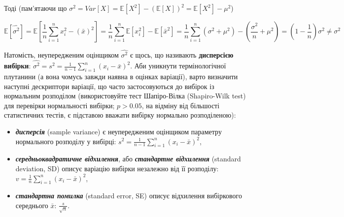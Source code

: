 \documentclass[
  11pt,
]{book}
\begin{document}
Тоді (пам'ятаючи що \(\sigma^2 = Var[X] = \mathbb{E} [X^2] - (\mathbb{E} [X])^2 = \mathbb{E} [X^2] - \mu^2\))

\[\mathbb{E} [\hat{\sigma^2}] = \mathbb{E} \left[ \frac{1}{n} \sum \limits_{i=1}^n x_i^2 - (\bar{x})^2 \right] = \frac{1}{n} \sum \limits_{i = 1}^n \mathbb{E} [x_i^2] - \mathbb{E} [\bar{x}^2] = \frac{1}{n}  \sum \limits_{i = 1}^n (\sigma^2 + \mu^2) - (\frac{\sigma^2}{n} + \mu^2) = (1 - \frac{1}{n}) \sigma^2 \neq \sigma^2\]

Натомість, неупередженим оцінщиком \(\hat{\sigma^2}\) є щось, що називають \textbf{дисперсією вибірки}: \(\hat{\sigma^2} = s^2 = \frac{1}{n-1} \sum \limits_{i=1}^n (x_i - \bar{x})^2\). Аби уникнути термінологічної плутанини (а вона чомусь завжди наявна в оцінках варіації), варто визначити наступні дескриптори варіації, що часто застосовуються до вибірок із нормальним розподілом (використовуйте тест Шапіро-Вілка (Shapiro-Wilk test) для перевірки нормальності вибірки; \(p > 0.05\), на відміну від більшості статистичних тестів, є підставою вважати вибірку нормально розподіленою):

\begin{itemize}
\item
  \textbf{\emph{дисперсія}} (sample variance) є неупередженим оцінщиком параметру нормального розподілу у вибірці: \(s^2 = \frac{1}{n-1} \sum \limits_{i=1}^n (x_i - \bar{x})^2\),
\item
  \textbf{\emph{середньоквадратичне відхилення}}, або \textbf{\emph{стандартне відхилення}} (standard deviation, SD) описує варіацію вибірки незалежно від її розподілу: \(v = \frac{1}{n} \sum \limits_{i=1}^n (x_i - \bar{x})^2\),
\item
  \textbf{\emph{стандартна помилка}} (standard error, SE) описує відхилення вибіркового середнього \(\bar{x}\): \(\frac{s}{\sqrt{n}}\).
\end{itemize}
\end{document}
